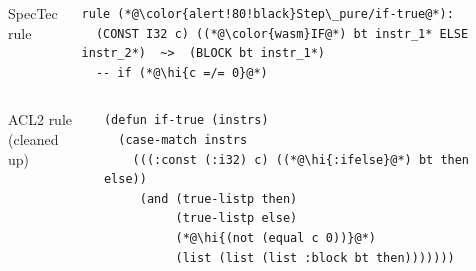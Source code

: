 \documentclass[aspectratio=169,11pt]{beamer}
\newcommand{\muted}[1]{{\color{muted}#1}}
\newcommand{\hi}[1]{{\color{wasm}\bfseries #1}}
\begin{document}
\begin{frame}[fragile]
  \vspace*{6mm}
  \begin{columns}[c]
      \begin{center}\LARGE SpecTec rule\end{center}
\begin{lstlisting}[style=spectec]
rule (*@\color{alert!80!black}Step\_pure/if-true@*):
  (CONST I32 c) ((*@\color{wasm}IF@*) bt instr_1* ELSE instr_2*)  ~>  (BLOCK bt instr_1*)
  -- if (*@\hi{c =/= 0}@*)
\end{lstlisting}
  \end{columns}
  \vspace*{5mm}
  \begin{columns}[c]
      \begin{center}\LARGE ACL2 rule\\\muted{\large (cleaned up)}\end{center}
\begin{lstlisting}[style=acl2]
(defun if-true (instrs)
  (case-match instrs
    (((:const (:i32) c) ((*@\hi{:ifelse}@*) bt then else))
     (and (true-listp then)
          (true-listp else)
          (*@\hi{(not (equal c 0))}@*)
          (list (list (list :block bt then)))))))
\end{lstlisting}
      \vspace*{2mm}
  \end{columns}
  \vfill
\end{frame}
\end{document}
